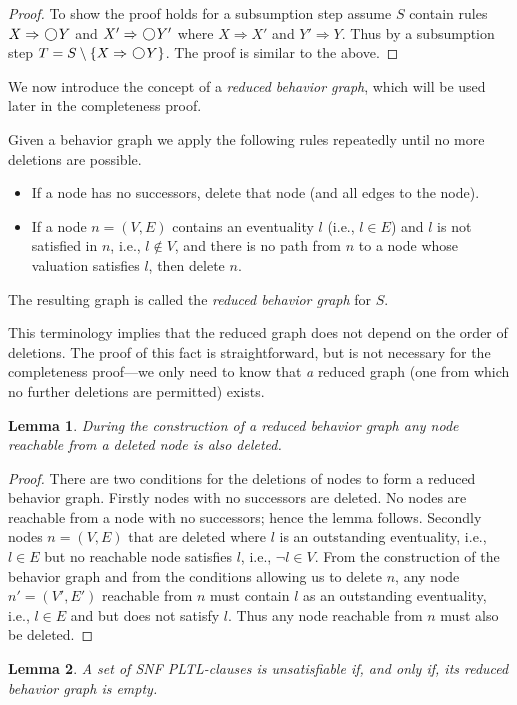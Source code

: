 \documentclass[nohyperref]{acmtrans2f}
\newcommand{\next}{\!\raisebox{-.2ex}{ %
                        \mbox{\unitlength=0.9ex
                        \begin{picture}(2,2)
                        \linethickness{0.06ex}
                        \put(1,1){\circle{2}} %
                        \end{picture}}}       %
                        \,}
\let\imp=\Rightarrow
\newtheorem{sublemma}{Lemma}[subsection]
\begin{document}
\begin{proof}
To show the proof holds for a subsumption step assume $S$ contain rules $X
\imp \next Y$ and $X' \imp \next Y'$ where $X \imp X'$ and $Y' \imp
Y$. Thus by a subsumption step $T = S \setminus \{X \imp \next Y\}$. The proof is
similar to the above.
%
\end{proof}

\noindent We now introduce the concept of a {\em reduced behavior
graph}, which will be used later in the completeness proof.

\begin{subdefn}
%
Given a behavior graph we apply the following rules repeatedly until
no more deletions are possible.
\begin{itemize}
\item If a node has no successors, delete that node (and all edges to
      the node).  
\item If a node $n=(V,E)$ contains an eventuality $l$ (i.e., $l \in E$) and $l$ is not
      satisfied in 
      $n$, i.e., $l \not \in V$, and there is no path 
      from $n$ to a node whose valuation satisfies $l$, then
      delete $n$. 
\end{itemize}
%
The resulting graph is called the {\em reduced behavior graph} for
$S$.
\end{subdefn}

\noindent This terminology implies that the reduced graph does not
depend on the order of deletions. The proof of this fact is
straightforward, but is not necessary for the completeness proof---we
only need to know that {\em a} reduced graph (one from which no further
deletions are permitted) exists.
\begin{sublemma}\label{cor1}
During the construction of a reduced behavior graph
any node reachable from a deleted node is also deleted.
\end{sublemma}
\begin{proof}
There are two conditions for the deletions of nodes to form a reduced
behavior graph. Firstly nodes with no successors are deleted. No nodes are
reachable from a node with no successors; hence the lemma
follows. Secondly nodes $n=(V,E)$ that are deleted where $l$ is an outstanding
eventuality, i.e., $l \in E$ but no reachable node satisfies $l$,
i.e., $\neg l \in V$. From the construction of the behavior graph and from the
conditions allowing us to delete $n$, any node
$n'=(V',E')$ reachable from $n$ must contain $l$ as an outstanding
eventuality, i.e., $l \in E$ and  but does not satisfy $l$. Thus any node
reachable from $n$ must also be deleted.
\end{proof}
\begin{sublemma}
\label{empty.unsat}
A set of SNF PLTL-clauses is unsatisfiable if, and only if, its reduced
behavior graph is empty.
\end{sublemma}
\end{document}
